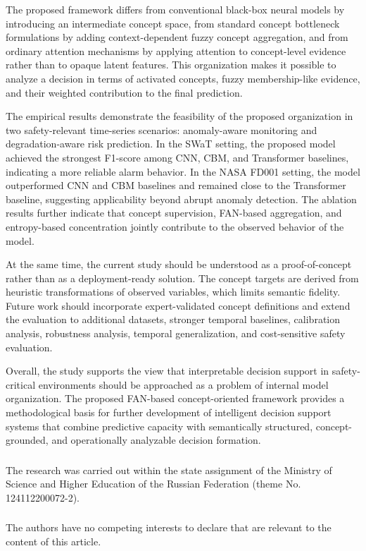 \documentclass[runningheads]{llncs}
\begin{document}
The proposed framework differs from conventional black-box neural models by introducing an intermediate concept space, from standard concept bottleneck formulations by adding context-dependent fuzzy concept aggregation, and from ordinary attention mechanisms by applying attention to concept-level evidence rather than to opaque latent features. This organization makes it possible to analyze a decision in terms of activated concepts, fuzzy membership-like evidence, and their weighted contribution to the final prediction.

The empirical results demonstrate the feasibility of the proposed organization in two safety-relevant time-series scenarios: anomaly-aware monitoring and degradation-aware risk prediction. In the SWaT setting, the proposed model achieved the strongest F1-score among CNN, CBM, and Transformer baselines, indicating a more reliable alarm behavior. In the NASA FD001 setting, the model outperformed CNN and CBM baselines and remained close to the Transformer baseline, suggesting applicability beyond abrupt anomaly detection. The ablation results further indicate that concept supervision, FAN-based aggregation, and entropy-based concentration jointly contribute to the observed behavior of the model.

At the same time, the current study should be understood as a proof-of-concept rather than as a deployment-ready solution. The concept targets are derived from heuristic transformations of observed variables, which limits semantic fidelity. Future work should incorporate expert-validated concept definitions and extend the evaluation to additional datasets, stronger temporal baselines, calibration analysis, robustness analysis, temporal generalization, and cost-sensitive safety evaluation.

Overall, the study supports the view that interpretable decision support in safety-critical environments should be approached as a problem of internal model organization. The proposed FAN-based concept-oriented framework provides a methodological basis for further development of intelligent decision support systems that combine predictive capacity with semantically structured, concept-grounded, and operationally analyzable decision formation.

\begin{credits}
\subsubsection{\ackname}
The research was carried out within the state assignment of the Ministry of Science and Higher Education of the Russian Federation
(theme No. 124112200072-2).

\subsubsection{\discintname}
The authors have no competing interests to declare that are relevant to the content of this article.
\end{credits}



\end{document}
